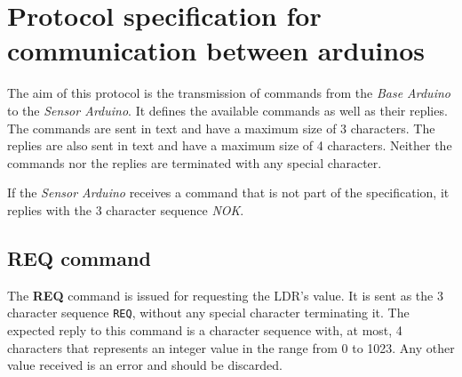 \documentclass[conference, a4paper]{IEEEtran}
\begin{document}




%
%
%


\appendices

\section{Protocol specification for communication between arduinos}
\label{prot_ard}

The aim of this protocol is the transmission of commands from the \textit{Base Arduino} to the \textit{Sensor Arduino}. It defines the available commands as well as their replies. The commands are sent in text and have a maximum size of 3 characters. The replies are also sent in text and have a maximum size of 4 characters. Neither the commands nor the replies are terminated with any special character.

If the \textit{Sensor Arduino} receives a command that is not part of the specification, it replies with the 3 character sequence \textit{NOK}.

\subsection{REQ command}

The \textbf{REQ} command is issued for requesting the LDR's value. It is sent as the 3 character sequence \texttt{REQ}, without any special character terminating it. The expected reply to this command is a character sequence with, at most, 4 characters that represents an integer value in the range from 0 to 1023. Any other value received is an error and should be discarded.
\end{document}
